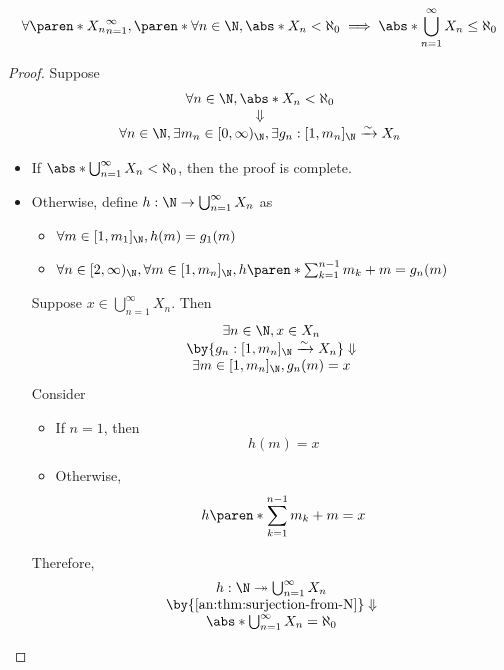 \bigskip

\begin{theorem} \label{an:thm:countable-union-of-finite-sets-is-at-most-countable}
  \[
    \forall \paren*{X_{n}}_{n = 1}^{\infty},
    \paren*{\forall n \in \N, \abs*{X_{n}} < \aleph_{0}}
    \implies \abs*{\bigcup_{n = 1}^{\infty} X_{n}} \leq \aleph_{0}
  \]
\end{theorem}

\begin{proof}
  Suppose
  \[
    \begin{array}{c}
      \forall n \in \N, \abs*{X_{n}} < \aleph_{0} \\
      \Downarrow                                  \\
      \forall n \in \N, \exists m_{n} \in [0, \infty)_{\N}, \exists g_{n}: [1, m_{n}]_{\N} \xrightarrow{\sim} X_{n}
    \end{array}
  \]
  \begin{itemize}
    \item If $\abs*{\bigcup_{n = 1}^{\infty} X_{n}} < \aleph_{0}$, then the proof is complete.
    \item Otherwise, define $h: \N \to \bigcup_{n = 1}^{\infty} X_{n}$ as
          \begin{itemize}
            \item $\forall m \in [1, m_{1}]_{\N}, h(m) = g_{1}(m)$
            \item $\forall n \in [2, \infty)_{\N}, \forall m \in [1, m_{n}]_{\N}, h\paren*{\sum_{k = 1}^{n - 1} m_{k} + m} = g_{n}(m)$
          \end{itemize}
          Suppose $x \in \bigcup_{n = 1}^{\infty} X_{n}$. Then
          \[
            \begin{array}{c}
              \exists n \in \N, x \in X_{n}                                                \\
              \by{\ensuremath{g_{n}: [1, m_{n}]_{\N} \xrightarrow{\sim} X_{n}}} \Downarrow \\
              \exists m \in [1, m_{n}]_{\N}, g_{n}(m) = x                                  \\
            \end{array}
          \]
          Consider
          \begin{itemize}
            \item If $n = 1$, then
                  \[
                    h(m) = x
                  \]
            \item Otherwise,
                  \[
                    h\paren*{\sum_{k = 1}^{n - 1} m_{k} + m} = x
                  \]
          \end{itemize}
          Therefore,
          \[
            \begin{array}{c}
              h: \N \twoheadrightarrow \bigcup_{n = 1}^{\infty} X_{n} \\
              \by{\Cref{an:thm:surjection-from-N}} \Downarrow         \\
              \abs*{\bigcup_{n = 1}^{\infty} X_{n}} = \aleph_{0}
            \end{array}
          \]
  \end{itemize}
\end{proof}

